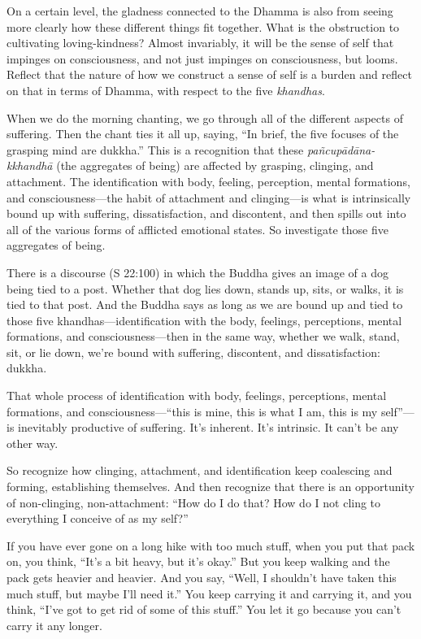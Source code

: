 On a certain level, the gladness connected to the Dhamma is also from
seeing more clearly how these different things fit together. What is the
obstruction to cultivating loving-kindness? Almost invariably, it will
be the sense of self that impinges on consciousness, and not just
impinges on consciousness, but looms. Reflect that the nature of how we
construct a sense of self is a burden and reflect on that in terms of
Dhamma, with respect to the five \emph{khandhas}.

When we do the morning chanting, we go through all of the different
aspects of suffering. Then the chant ties it all up, saying, “In brief,
the five focuses of the grasping mind are dukkha.” This is a recognition
that these \emph{pañcupādāna-kkhandhā} (the aggregates of being) are
affected by grasping, clinging, and attachment. The identification with
body, feeling, perception, mental formations, and consciousness—the
habit of attachment and clinging—is what is intrinsically bound up with
suffering, dissatisfaction, and discontent, and then spills out into all
of the various forms of afflicted emotional states. So investigate those
five aggregates of being.

There is a discourse (S 22:100) in which the Buddha gives an image of a
dog being tied to a post. Whether that dog lies down, stands up, sits,
or walks, it is tied to that post. And the Buddha says as long as we are
bound up and tied to those five khandhas—identification with the body,
feelings, perceptions, mental formations, and consciousness—then in the
same way, whether we walk, stand, sit, or lie down, we’re bound with
suffering, discontent, and dissatisfaction: dukkha.

That whole process of identification with body, feelings, perceptions,
mental formations, and consciousness—“this is mine, this is what I am,
this is my self”—is inevitably productive of suffering. It’s inherent.
It’s intrinsic. It can’t be any other way.

So recognize how clinging, attachment, and identification keep
coalescing and forming, establishing themselves. And then recognize that
there is an opportunity of non-clinging, non-attachment: “How do I do
that? How do I not cling to everything I conceive of as my self?”

If you have ever gone on a long hike with too much stuff, when you put
that pack on, you think, “It’s a bit heavy, but it’s okay.” But you keep
walking and the pack gets heavier and heavier. And you say, “Well, I
shouldn’t have taken this much stuff, but maybe I’ll need it.” You keep
carrying it and carrying it, and you think, “I’ve got to get rid of some
of this stuff.” You let it go because you can’t carry it any longer.

